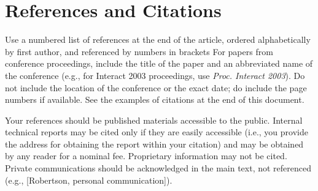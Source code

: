 \documentclass{sigchi-ext}
\begin{document}
\section{References and Citations}
Use a numbered list of references at the end of the article, ordered alphabetically by first author, and referenced by numbers in brackets \cite{Anderson92,Klemmer02,Mather00,Zellweger01}
For papers from conference proceedings, include the title of the paper and an abbreviated name of the conference (e.g., for Interact 2003 proceedings, use \emph{Proc. Interact 2003}). 
Do not include the location of the conference or the exact date; do include the page numbers if available. 
See the examples of citations at the end of this document. 

Your references should be published materials accessible to the public.  
Internal technical reports may be cited only if they are easily accessible (i.e., you provide the address for obtaining the report within your citation) and may be obtained by any reader for a nominal fee.  
Proprietary information may not be cited. 
Private communications should be acknowledged in the main text, not referenced  (e.g., [Robertson, personal communication]).
\end{document}
